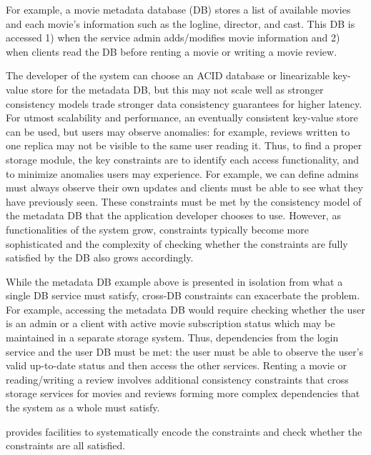 For example, a movie metadata database (DB) stores a list of
available movies and each movie's information such as the
logline, director, and cast. This DB is accessed 1) when
the service admin adds/modifies movie information and
2) when clients read the DB before renting a movie
or writing a movie review.

The developer of the system can choose an ACID database or linearizable
key-value store for the metadata DB, but this may not scale well as
stronger consistency models trade stronger data consistency guarantees for higher latency.
For utmost scalability and performance, an eventually consistent
key-value store can be used, but users may observe anomalies: for example, reviews
written to one replica may not be visible to the same user reading it.
Thus, to find a proper storage module, the key constraints are to identify
each access functionality, and to minimize anomalies users may experience.
For example, we can define admins must always observe their own
updates and clients must be able
to see what they have previously seen. These constraints
must be met by the consistency model of the metadata DB that the application developer chooses to use.
However, as functionalities of the system grow, constraints typically become
more sophisticated and the complexity of checking whether the constraints are fully satisfied by the 
DB also grows accordingly.

While the metadata DB example above is presented in isolation from
what a single DB service must satisfy, cross-DB constraints can exacerbate
the problem. For example, accessing the metadata DB would require
checking whether the user is an admin or a client with active movie subscription
status which may be maintained in a separate storage system. Thus,
dependencies from the login service and the user DB must be met:
the user must be able to observe the user's valid up-to-date status
and then access the other services. Renting a movie or reading/writing a
review involves additional consistency constraints that cross storage services
for movies and reviews forming more complex dependencies that the system as a
whole must satisfy.

\sysname{} provides facilities to systematically encode the constraints
and check whether the constraints are all satisfied.
